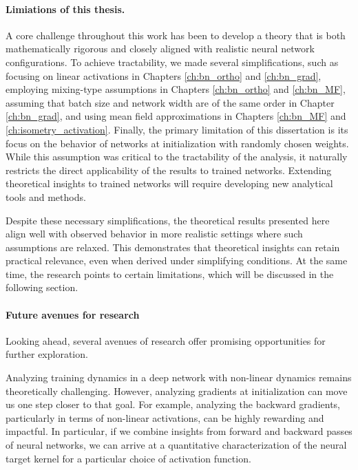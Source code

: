 \paragraph{Limiations of this thesis.}
A core challenge throughout this work has been to develop a theory that is both mathematically rigorous and closely aligned with realistic neural network configurations. To achieve tractability, we made several simplifications, such as focusing on linear activations in Chapters \ref{ch:bn_ortho} and \ref{ch:bn_grad}, employing mixing-type assumptions in Chapters \ref{ch:bn_ortho} and \ref{ch:bn_MF}, assuming that batch size and network width are of the same order in Chapter \ref{ch:bn_grad}, and using mean field approximations in Chapters \ref{ch:bn_MF} and \ref{ch:isometry_activation}. Finally, the primary limitation of this dissertation is its focus on the behavior of networks at initialization with randomly chosen weights. While this assumption was critical to the tractability of the analysis, it naturally restricts the direct applicability of the results to trained networks. Extending theoretical insights to trained networks will require developing new analytical tools and methods.

Despite these necessary simplifications, the theoretical results presented here align well with observed behavior in more realistic settings where such assumptions are relaxed. This demonstrates that theoretical insights can retain practical relevance, even when derived under simplifying conditions. At the same time, the research points to certain limitations, which will be discussed in the following section.


\paragraph{Future avenues for research}
Looking ahead, several avenues of research offer promising opportunities for further exploration.   

Analyzing training dynamics in a deep network with non-linear dynamics remains theoretically challenging. However, analyzing gradients at initialization can move us one step closer to that goal. For example, analyzing the backward gradients, particularly in terms of non-linear activations, can be highly rewarding and impactful. In particular, if we combine insights from forward and backward passes of neural networks, we can arrive at a quantitative characterization of the neural target kernel for a particular choice of activation function. 

